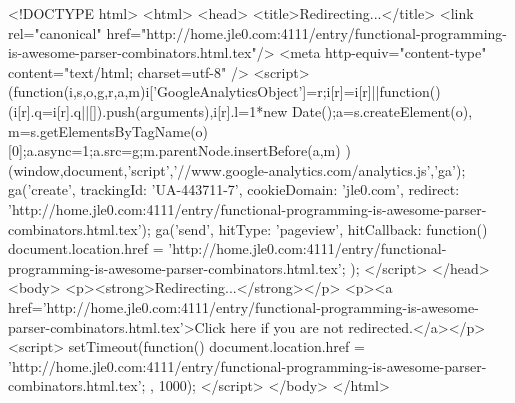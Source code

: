 <!DOCTYPE html>
<html>
<head>
<title>Redirecting...</title>
<link rel="canonical" href="http://home.jle0.com:4111/entry/functional-programming-is-awesome-parser-combinators.html.tex"/>
<meta http-equiv="content-type" content="text/html; charset=utf-8" />
<script>
(function(i,s,o,g,r,a,m){i['GoogleAnalyticsObject']=r;i[r]=i[r]||function(){
(i[r].q=i[r].q||[]).push(arguments)},i[r].l=1*new Date();a=s.createElement(o),
m=s.getElementsByTagName(o)[0];a.async=1;a.src=g;m.parentNode.insertBefore(a,m)
})(window,document,'script','//www.google-analytics.com/analytics.js','ga');
ga('create', { trackingId: 'UA-443711-7', cookieDomain: 'jle0.com', redirect: 'http://home.jle0.com:4111/entry/functional-programming-is-awesome-parser-combinators.html.tex'});
ga('send', { hitType: 'pageview', hitCallback: function() { document.location.href = 'http://home.jle0.com:4111/entry/functional-programming-is-awesome-parser-combinators.html.tex'; } });
</script>
</head>
<body>
  <p><strong>Redirecting...</strong></p>
  <p><a href='http://home.jle0.com:4111/entry/functional-programming-is-awesome-parser-combinators.html.tex'>Click here if you are not redirected.</a></p>
  <script>
    setTimeout(function() { document.location.href = 'http://home.jle0.com:4111/entry/functional-programming-is-awesome-parser-combinators.html.tex'; }, 1000);
  </script>
</body>
</html>
